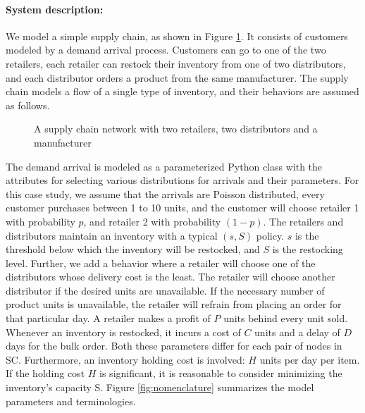 \paragraph{System description:} We model a simple supply chain, as shown in Figure \ref{fig:simple_supply_chain_net}. It consists of customers modeled by a demand arrival process. Customers can go to one of the two retailers, each retailer can restock their inventory from one of two distributors, and each distributor orders a product from the same manufacturer. The supply chain models a flow of a single type of inventory, and their behaviors are assumed as follows.

\begin{figure}[!h]
  \vspace{-0.2cm}
  \centering
   {}
  \caption{A supply chain network with two retailers, two distributors and a manufacturer}
  \label{fig:simple_supply_chain_net}
  \vspace{-0.1cm}
\end{figure}

The demand arrival is modeled as a parameterized Python class with the attributes for selecting various distributions for arrivals and their parameters. For this case study, we assume that the arrivals are Poisson distributed, every customer purchases between 1 to 10 units, and the customer will choose retailer 1 with probability $p$, and retailer 2 with probability $(1-p)$. The retailers and distributors maintain an inventory with a typical $(s, S)$ policy. $s$ is the threshold below which the inventory will be restocked, and $S$ is the restocking level. Further, we add a behavior where a retailer will choose one of the distributors whose delivery cost is the least. The retailer will choose another distributor if the desired units are unavailable. If the necessary number of product units is unavailable, the retailer will refrain from placing an order for that particular day. A retailer makes a profit of $P$ units behind every unit sold. Whenever an inventory is restocked, it incurs a cost of $C$ units and a delay of $D$ days for the bulk order. Both these parameters differ for each pair of nodes in SC. Furthermore, an inventory holding cost is involved: $H$ units per day per item. If the holding cost $H$ is significant, it is reasonable to consider minimizing the inventory's capacity S. Figure \ref{fig:nomenclature} summarizes the model parameters and terminologies.

